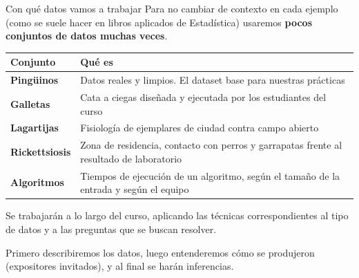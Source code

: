 \documentclass[aspectratio=169,10pt]{beamer}
\newcommand{\destaca}[1]{%
  \par\vspace{3pt}\noindent
  \colorbox{azulClaro}{%
    \parbox{\dimexpr\linewidth-2\fboxsep\relax}{\vspace{3pt}#1\vspace{3pt}}}%
  \par\vspace{3pt}}
\begin{document}
\begin{frame}{Con qué datos vamos a trabajar}
  Para no cambiar de contexto en cada ejemplo (como se suele hacer en libros aplicados de Estadística) usaremos \textbf{pocos conjuntos de datos muchas veces}.
  \vspace{0.4cm}

  \centering
  {\small
  \begin{tabular}{@{}p{3.5cm}p{8.5cm}@{}}
    \toprule
    \textbf{Conjunto} & \textbf{Qué es} \\
    \midrule
    \textbf{Pingüinos} & %
    Datos reales y limpios. El dataset base para nuestras prácticas \\
    \textbf{Galletas} & Cata a ciegas diseñada y ejecutada por los estudiantes del curso \\
    \textbf{Lagartijas} & Fisiología de ejemplares de ciudad contra campo abierto \\
    \textbf{Rickettsiosis} & Zona de residencia, contacto con perros y garrapatas frente al resultado de laboratorio \\
    \textbf{Algoritmos} & Tiempos de ejecución de un algoritmo, según el tamaño de la entrada y según el equipo \\
    \bottomrule
  \end{tabular}}
  \vspace{0.5cm}
  \raggedright

 \destaca{Se trabajarán a lo largo del curso, aplicando las técnicas correspondientes al tipo de datos y a las preguntas que se buscan resolver.
 
\vspace{2mm}
  Primero describiremos los datos, luego entenderemos cómo se produjeron (expositores invitados), y al final se harán inferencias.}
\end{frame}
\end{document}
